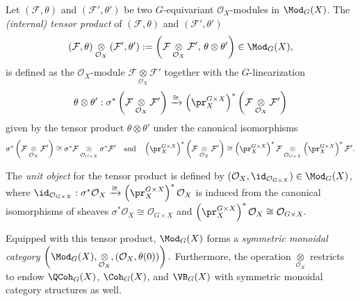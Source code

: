 \begin{defn}
\label{defn:TensorProductOfEquivariantModules}
Let $(\mathcal{F}, \theta)$ and $(\mathcal{F}', \theta')$ be two $G$-equivariant $\mathcal{O}_X$-modules in $\Mod_G(X)$.
The \emph{(internal) tensor product} of $(\mathcal{F}, \theta)$ and $(\mathcal{F}', \theta')$
$$
(\mathcal{F}, \theta)
\underset{\mathcal{O}_X}{\otimes}
(\mathcal{F}', \theta')
:=
\left(\mathcal{F}\underset{\mathcal{O}_X}{\otimes}\mathcal{F}', \, \theta\otimes\theta'\right)
\in
\Mod_G(X),
$$
is defined as the $\mathcal{O}_X$-module $\mathcal{F}\underset{\mathcal{O}_X}{\otimes}\mathcal{F}'$
together with the $G$-linearization
$$
\theta\otimes\theta'
:
\sigma^*\left(
\mathcal{F}
\underset{\mathcal{O}_X}{\otimes}
\mathcal{F}'
\right)
\xrightarrow{\cong}
\left(\pr_X^{G \times X}\right)^*
\left(\mathcal{F}
\underset{\mathcal{O}_X}{\otimes}
\mathcal{F}'\right)
$$
given by the tensor product $\theta \otimes \theta'$
under the canonical isomorphisms
$$
\sigma^*\left(\mathcal{F}\underset{\mathcal{O}_X}{\otimes}\mathcal{F}'\right)
\cong
\sigma^* \mathcal{F} \underset{\mathcal{O}_{G \times X}}{\otimes} \sigma^* \mathcal{F}'
\quad\text{and}\quad
\left(\pr_X^{G \times X}\right)^* \left(\mathcal{F}\underset{\mathcal{O}_X}{\otimes}\mathcal{F}'\right)
\cong
\left(\pr_X^{G \times X}\right)^*\mathcal{F} \underset{\mathcal{O}_{G \times X}}{\otimes} \left(\pr_X^{G \times X}\right)^*\mathcal{F}'.
$$


The \emph{unit object} for the tensor product is defined by
$(\mathcal{O}_X, \id_{\mathcal{O}_{G\times X}}) \in \Mod_G(X)$,
where
$
\id_{\mathcal{O}_{G\times X}}
:
\sigma^* \mathcal{O}_X
\xrightarrow{\cong}
\left(\pr_X^{G \times X}\right)^* \mathcal{O}_X
$
is induced from the canonical isomorphisms of sheaves
$
\sigma^* \mathcal{O}_X
\cong
\mathcal{O}_{G\times X}
$
and
$
\left(\pr_X^{G \times X}\right)^* \mathcal{O}_X
\cong
\mathcal{O}_{G\times X}.
$


Equipped with this tensor product,
$\Mod_G(X)$
forms a
\emph{symmetric monoidal category}
$
\left(
\Mod_G(X),
\underset{\mathcal{O}_X}{\otimes},
\left(\mathcal{O}_X,\theta(0)\right)
\right).
$
Furthermore, the operation $\underset{\mathcal{O}_X}{\otimes}$ restricts to endow
$\QCoh_G(X)$, $\Coh_G(X)$, and $\VB_G(X)$
with symmetric monoidal category structures as well.

\end{defn}



